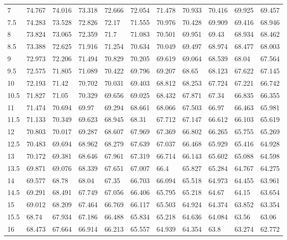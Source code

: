 \begin{bibunit}
\begin{table}[]
\begin{tabular}{lllllllllll}
			7    & 74.767 & 74.016 & 73.318 & 72.666 & 72.054 & 71.478 & 70.933 & 70.416 & 69.925 & 69.457 \\
			7.5  & 74.283 & 73.528 & 72.826 & 72.17  & 71.555 & 70.976 & 70.428 & 69.909 & 69.416 & 68.946 \\
			8    & 73.824 & 73.065 & 72.359 & 71.7   & 71.083 & 70.501 & 69.951 & 69.43  & 68.934 & 68.462 \\
			8.5  & 73.388 & 72.625 & 71.916 & 71.254 & 70.634 & 70.049 & 69.497 & 68.974 & 68.477 & 68.003 \\
			9    & 72.973 & 72.206 & 71.494 & 70.829 & 70.205 & 69.619 & 69.064 & 68.539 & 68.04  & 67.564 \\
			9.5  & 72.575 & 71.805 & 71.089 & 70.422 & 69.796 & 69.207 & 68.65  & 68.123 & 67.622 & 67.145 \\
			10   & 72.193 & 71.42  & 70.702 & 70.031 & 69.403 & 68.812 & 68.253 & 67.724 & 67.221 & 66.742 \\
			10.5 & 71.827 & 71.05  & 70.329 & 69.656 & 69.025 & 68.432 & 67.871 & 67.34  & 66.835 & 66.355 \\
			11   & 71.474 & 70.694 & 69.97  & 69.294 & 68.661 & 68.066 & 67.503 & 66.97  & 66.463 & 65.981 \\
			11.5 & 71.133 & 70.349 & 69.623 & 68.945 & 68.31  & 67.712 & 67.147 & 66.612 & 66.103 & 65.619 \\
			12   & 70.803 & 70.017 & 69.287 & 68.607 & 67.969 & 67.369 & 66.802 & 66.265 & 65.755 & 65.269 \\
			12.5 & 70.483 & 69.694 & 68.962 & 68.279 & 67.639 & 67.037 & 66.468 & 65.929 & 65.416 & 64.928 \\
			13   & 70.172 & 69.381 & 68.646 & 67.961 & 67.319 & 66.714 & 66.143 & 65.602 & 65.088 & 64.598 \\
			13.5 & 69.871 & 69.076 & 68.339 & 67.651 & 67.007 & 66.4   & 65.827 & 65.284 & 64.767 & 64.275 \\
			14   & 69.577 & 68.78  & 68.04  & 67.35  & 66.703 & 66.094 & 65.518 & 64.973 & 64.455 & 63.961 \\
			14.5 & 69.291 & 68.491 & 67.749 & 67.056 & 66.406 & 65.795 & 65.218 & 64.67  & 64.15  & 63.654 \\
			15   & 69.012 & 68.209 & 67.464 & 66.769 & 66.117 & 65.503 & 64.924 & 64.374 & 63.852 & 63.354 \\
			15.5 & 68.74  & 67.934 & 67.186 & 66.488 & 65.834 & 65.218 & 64.636 & 64.084 & 63.56  & 63.06  \\
			16   & 68.473 & 67.664 & 66.914 & 66.213 & 65.557 & 64.939 & 64.354 & 63.8   & 63.274 & 62.772 \\

\end{tabular}
\end{table}
\end{bibunit}
